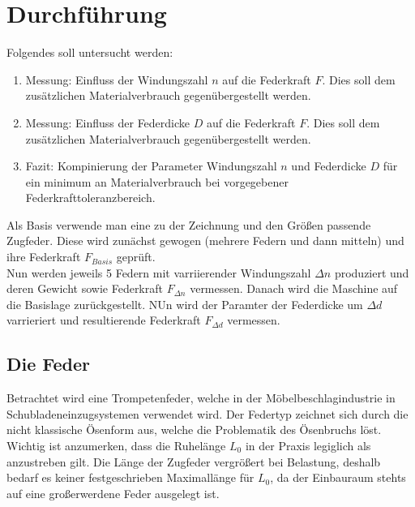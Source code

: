 \newpage
\section{Durchführung}
Folgendes soll untersucht werden:
\begin{enumerate}
    \item Messung: Einfluss der Windungszahl $n$ auf die Federkraft $F$. Dies soll dem zusätzlichen
    Materialverbrauch gegenübergestellt werden.
    \item Messung: Einfluss der Federdicke $D$ auf die Federkraft $F$. Dies soll dem zusätzlichen
    Materialverbrauch gegenübergestellt werden.
    \item Fazit: Kompinierung der Parameter Windungszahl $n$ und Federdicke $D$ für ein minimum
    an Materialverbrauch bei vorgegebener Federkrafttoleranzbereich.
\end{enumerate}
Als Basis verwende man eine zu der Zeichnung und den Größen passende Zugfeder. Diese
wird zunächst gewogen (mehrere Federn und dann mitteln) und ihre Federkraft $F_{Basis}$
geprüft.\\
Nun werden jeweils 5 Federn mit varriierender Windungszahl $\Delta n$ produziert und deren
Gewicht sowie Federkraft $F_{\Delta n}$ vermessen.
Danach wird die Maschine auf die Basislage zurückgestellt. NUn wird der Paramter 
der Federdicke um $\Delta d$ varrieriert und resultierende Federkraft $F_{\Delta d}$
vermessen.  

\newpage

\subsection{Die Feder}

Betrachtet wird eine Trompetenfeder, welche in der Möbelbeschlagindustrie in Schubladeneinzugsystemen
verwendet wird. 
Der Federtyp zeichnet sich durch die nicht klassische Ösenform aus, welche die Problematik des Ösenbruchs löst.\\

Wichtig ist anzumerken, dass die Ruhelänge $L_0$ in der Praxis legiglich als anzustreben gilt.
Die Länge der Zugfeder vergrößert bei Belastung, deshalb bedarf es keiner festgeschrieben Maximallänge für $L_0$, da
der Einbauraum stehts auf eine großerwerdene Feder ausgelegt ist.  
\newline

